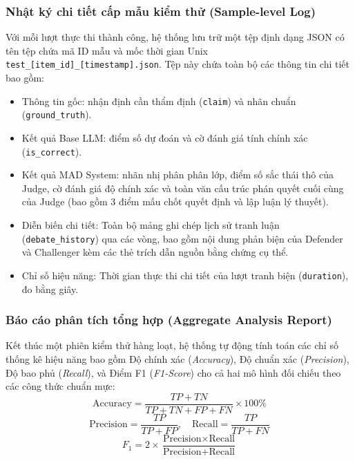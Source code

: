 \documentclass[12pt,a4paper]{report}
\begin{document}
\subsubsection{Nhật ký chi tiết cấp mẫu kiểm thử (Sample-level Log)}
Với mỗi lượt thực thi thành công, hệ thống lưu trữ một tệp định dạng JSON có tên tệp chứa mã ID mẫu và mốc thời gian Unix \texttt{test\_[item\_id]\_[timestamp].json}. Tệp này chứa toàn bộ các thông tin chi tiết bao gồm:
\begin{itemize}
    \item Thông tin gốc: nhận định cần thẩm định (\texttt{claim}) và nhãn chuẩn (\texttt{ground\_truth}).
    \item Kết quả Base LLM: điểm số dự đoán và cờ đánh giá tính chính xác (\texttt{is\_correct}).
    \item Kết quả MAD System: nhãn nhị phân phân lớp, điểm số sắc thái thô của Judge, cờ đánh giá độ chính xác và toàn văn cấu trúc phán quyết cuối cùng của Judge (bao gồm 3 điểm mấu chốt quyết định và lập luận lý thuyết).
    \item Diễn biến chi tiết: Toàn bộ mảng ghi chép lịch sử tranh luận (\texttt{debate\_history}) qua các vòng, bao gồm nội dung phản biện của Defender và Challenger kèm các thẻ trích dẫn nguồn bằng chứng cụ thể.
    \item Chỉ số hiệu năng: Thời gian thực thi chi tiết của lượt tranh biện (\texttt{duration}), đo bằng giây.
\end{itemize}

\subsubsection{Báo cáo phân tích tổng hợp (Aggregate Analysis Report)}
Kết thúc một phiên kiểm thử hàng loạt, hệ thống tự động tính toán các chỉ số thống kê hiệu năng bao gồm Độ chính xác (\textit{Accuracy}), Độ chuẩn xác (\textit{Precision}), Độ bao phủ (\textit{Recall}), và Điểm F1 (\textit{F1-Score}) cho cả hai mô hình đối chiếu theo các công thức chuẩn mực:
\begin{equation}
    \text{Accuracy} = \frac{TP + TN}{TP + TN + FP + FN} \times 100\%
\end{equation}
\begin{equation}
    \text{Precision} = \frac{TP}{TP + FP}, \quad \text{Recall} = \frac{TP}{TP + FN}
\end{equation}
\begin{equation}
    F_1 = 2 \times \frac{\text{Precision} \times \text{Recall}}{\text{Precision} + \text{Recall}}
\end{equation}
\end{document}
